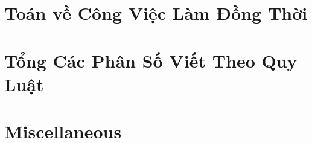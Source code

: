 \documentclass{article}
\begin{document}

\section{Toán về Công Việc Làm Đồng Thời}


\section{Tổng Các Phân Số Viết Theo Quy Luật}


\section{Miscellaneous}


\printbibliography[heading=bibintoc]
	
\end{document}
